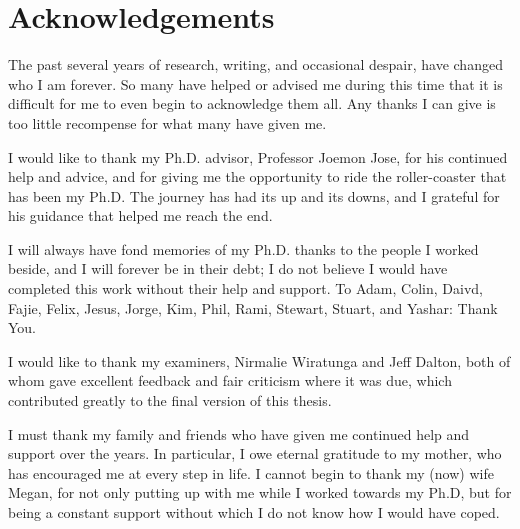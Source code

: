 
\chapter*{Acknowledgements}
The past several years of research, writing, and occasional despair, have changed who I am forever.
So many have helped or advised me during this time that it is difficult for me to even begin to acknowledge them all.
Any thanks I can give is too little  recompense for what many have given me.

I would like to thank my Ph.D. advisor, Professor Joemon Jose, for his continued help and advice, and for giving me the opportunity to ride the roller-coaster that has been my Ph.D.
The journey has had its up and its downs, and I grateful for his guidance that  helped me reach the end.

I will always have fond memories of my Ph.D. thanks to the people I worked beside, and I will forever be in their debt;
I do not believe I would have completed this work without their help and support.
To Adam, Colin, Daivd, Fajie, Felix, Jesus, Jorge, Kim, Phil, Rami, Stewart, Stuart, and Yashar: Thank You.

I would like to thank my examiners, Nirmalie Wiratunga and Jeff Dalton, both of whom gave excellent feedback and fair criticism where it was due, which contributed greatly to the final version of this thesis.

I must thank my family and friends who have given me continued help and support over the years.
In particular, I owe eternal gratitude to my mother, who has encouraged me at every step in life.
I cannot begin to thank my (now) wife Megan, for not only putting up with me while I worked towards my Ph.D, but for being a constant support without which I do not know how I would have coped.

